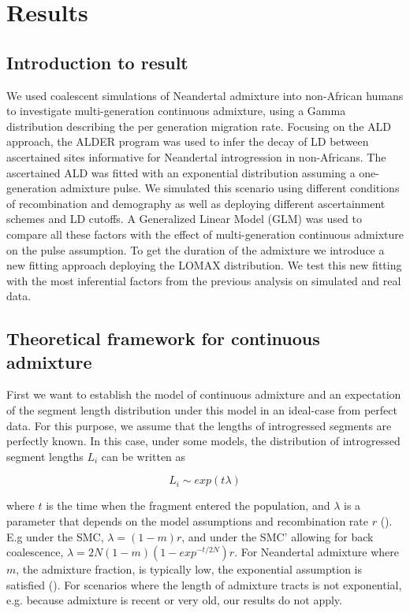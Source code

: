 \documentclass[]{article}
\begin{document}
\section{Results}\label{results}

\subsection{Introduction to result}\label{introduction to result}

We used coalescent simulations of Neandertal admixture into non-African humans to investigate multi-generation continuous admixture, using a Gamma distribution describing the per generation migration rate. Focusing on the ALD approach, the ALDER program was used to infer the decay of LD between ascertained sites informative for Neandertal introgression in non-Africans. The ascertained ALD was fitted with an exponential distribution assuming a one-generation admixture pulse.  We simulated this scenario using different conditions of recombination and demography as well as deploying different ascertainment schemes and LD cutoffs. A Generalized Linear Model (GLM) was used to compare all these factors with the effect of multi-generation continuous admixture on the pulse assumption. To get the duration of the admixture we introduce a new fitting approach deploying the LOMAX distribution. We test this new fitting with the most inferential factors from the previous analysis on simulated and real data.

\subsection{Theoretical framework for continuous admixture}\label{theoretical framework for continuous admixture}

First we want to establish the model of continuous admixture and an
expectation of the segment length distribution under this model in an
ideal-case from perfect data. For this purpose, we assume that the
lengths of introgressed segments are perfectly known. In this case, under
some models, the distribution of introgressed segment lengths \(L_i\) can
be written as

\begin{equation}
L_i \sim exp({t \lambda})
\end{equation}

where $t$ is the time when the fragment entered the population, and
\(\lambda\) is a parameter that depends on the model assumptions and
recombination rate \(r\) (\citep{liang_lengths_2014}). E.g under the SMC,
\(\lambda = (1-m)r\), and under the SMC' allowing for back coalescence,
\(\lambda = 2N(1-m)(1-exp^{-t/2N})r\). For Neandertal admixture where
\(m\), the admixture fraction, is typically low, the exponential
assumption is satisfied (\cite{liang_lengths_2014}). For scenarios where
the length of admixture tracts is not exponential, e.g. because
admixture is recent or very old, our results do not apply.
\end{document}
